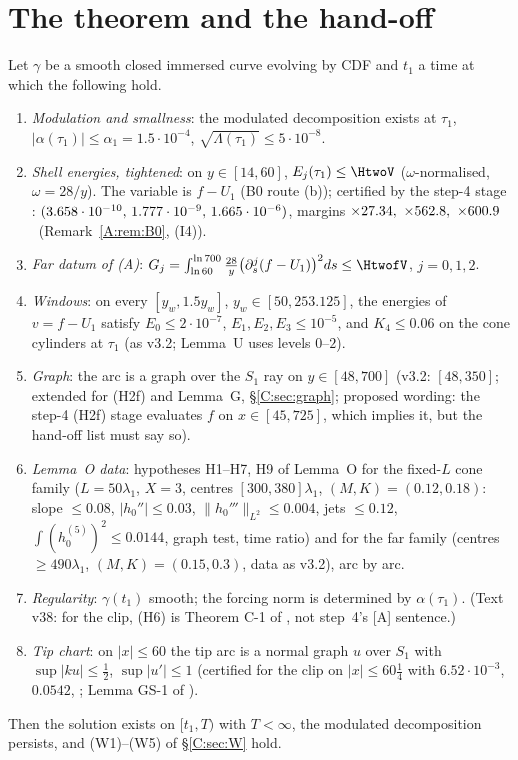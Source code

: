 \documentclass[11pt]{article}
\begin{document}
\section{The theorem and the hand-off}\label{M:sec:thm}
\begin{theorem}\label{M:thm:W}
Let $\gamma$ be a smooth closed immersed curve evolving by CDF and $t_1$ a time at which the following hold.
\begin{enumerate}[label=\textup{(H\arabic*)},leftmargin=*]
\item \emph{Modulation and smallness}: the modulated decomposition exists at $\tau_1$, $|\alpha(\tau_1)|\le\alpha_1=1.5\cdot10^{-4}$, $\sqrt{\Lambda(\tau_1)}\le5\cdot10^{-8}$.
\item \emph{Shell energies, tightened}: on $y\in[14,60]$, $E_j(\tau_1)\le\HtwoV$ ($\omega$-normalised, $\omega=28/y$).
The variable is $f-U_1$ (B0 route (b)); certified by the step-4 stage : $(3.658\cdot10^{-10},\,1.777\cdot10^{-9},\,1.665\cdot10^{-6})$, margins $\times27.34,\ \times562.8,\ \times600.9$ \tC\ (Remark~\ref{A:rem:B0}, (I4)).
\item[\textup{(H2f)}] \emph{Far datum of (A)}: $G_j=\int_{\ln60}^{\ln700}\frac{28}y\bigl(\partial_s^j(f-U_1)\bigr)^2ds\le\HtwofV$, $j=0,1,2$.
\item[\textup{(H3)}] \emph{Windows}: on every $[y_w,1.5y_w]$, $y_w\in[50,253.125]$, the energies of $v=f-U_1$ satisfy $E_0\le2\cdot10^{-7}$, $E_1,E_2,E_3\le10^{-5}$, and $K_4\le0.06$ on the cone cylinders at $\tau_1$ (as v3.2; Lemma~U uses levels $0$--$2$).
\item[\textup{(H4)}] \emph{Graph}: the arc is a graph over the $S_1$ ray on $y\in[48,700]$ (v3.2: $[48,350]$; extended for (H2f) and Lemma~G, \S\ref{C:sec:graph}; proposed wording: the step-4 (H2f) stage evaluates $f$ on $x\in[45,725]$, which implies it, but the hand-off list must say so).
\item[\textup{(H5)}] \emph{Lemma~O data}: hypotheses H1--H7, H9 of Lemma~O for the fixed-$L$ cone family ($L=50\lambda_1$, $X=3$, centres $[300,380]\lambda_1$, $(M,K)=(0.12,0.18)$: slope $\le0.08$, $|h_0''|\le0.03$, $\|h_0'''\|_{L^2}\le0.004$, jets $\le0.12$, $\int(h_0^{(5)})^2\le0.0144$, graph test, time ratio) and for the far family (centres $\ge490\lambda_1$, $(M,K)=(0.15,0.3)$, data as v3.2), arc by arc.
\item[\textup{(H6)}] \emph{Regularity}: $\gamma(t_1)$ smooth; the forcing norm is determined by $\alpha(\tau_1)$. (Text v38: for the clip, (H6) is Theorem C-1 of , not step~4's [A] sentence.)
\item[\textup{(GS)}] \emph{Tip chart}: on $|x|\le60$ the tip arc is a normal graph $u$ over $S_1$ with $\sup|ku|\le\frac12$, $\sup|u'|\le1$ (certified for the clip on $|x|\le60\frac14$ with $6.52\cdot10^{-3}$, $0.0542$, ; Lemma GS-1 of ).
\end{enumerate}
Then the solution exists on $[t_1,T)$ with $T<\infty$, the modulated decomposition persists, and (W1)--(W5) of \S\ref{C:sec:W} hold.
\end{theorem}
\end{document}
